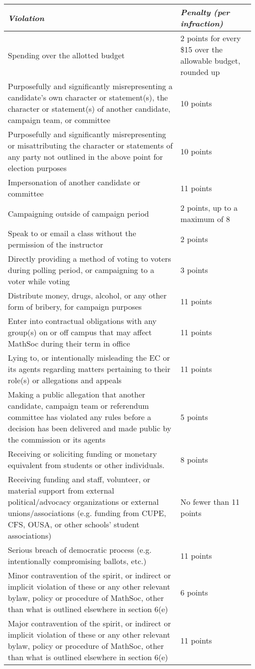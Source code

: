 \begin{tabular}{| p{12cm} | p{3.5cm} |}
	\hline
	\rowcolor{lightgray} \textit{\textbf{Violation}} & \textit{\textbf{Penalty (per infraction)}}  \\ 
	\hline
	Spending over the allotted budget & 2 points for every \$15 over the allowable budget, rounded up\\  
	\hline
	Purposefully and significantly misrepresenting a candidate’s own character or statement(s), the character or statement(s) of another candidate, campaign team, or committee & 10 points \\
	\hline
	Purposefully and significantly misrepresenting or misattributing the character or statements of any party not outlined in the above point for election purposes & 10 points \\
	\hline 
	Impersonation of another candidate or committee & 11 points \\
	\hline
	Campaigning outside of campaign period & 2 points, up to a maximum of 8 \\
	\hline
	Speak to or email a class without the permission of the instructor & 2 points \\
	\hline
	Directly providing a method of voting to voters during polling period, or campaigning to a voter while voting & 3 points \\
	\hline
	Distribute money, drugs, alcohol, or any other form of bribery, for campaign purposes & 11 points \\
	\hline 
	Enter into contractual obligations with any group(s) on or off campus that may affect MathSoc during their term in office & 11 points \\ 
	\hline 
	Lying to, or intentionally misleading the EC or its agents regarding matters pertaining to their role(s) or allegations and appeals & 11 points \\
	\hline
	Making a public allegation that another candidate, campaign team or referendum committee has violated any rules before a decision has been delivered and made public by the commission or its agents & 5 points \\
	\hline
	Receiving or soliciting funding or monetary equivalent from students or other individuals. & 8 points \\
	\hline 
	Receiving funding and staff, volunteer, or material support from external political/advocacy organizations or external unions/associations (e.g. funding from CUPE, CFS, OUSA, or other schools’ student associations) & No fewer than 11 points \\
	\hline 
	Serious breach of democratic process (e.g. intentionally compromising ballots, etc.) & 11 points \\ 
	\hline
	Minor contravention of the spirit, or indirect or implicit violation of these or any other relevant bylaw, policy or procedure of MathSoc, other than what is outlined elsewhere in section 6(e) & 6 points \\
	\hline
	Major contravention of the spirit, or indirect or implicit violation of these or any other relevant bylaw, policy or procedure of MathSoc, other than what is outlined elsewhere in section 6(e) & 11 points \\
	\hline
\end{tabular}


